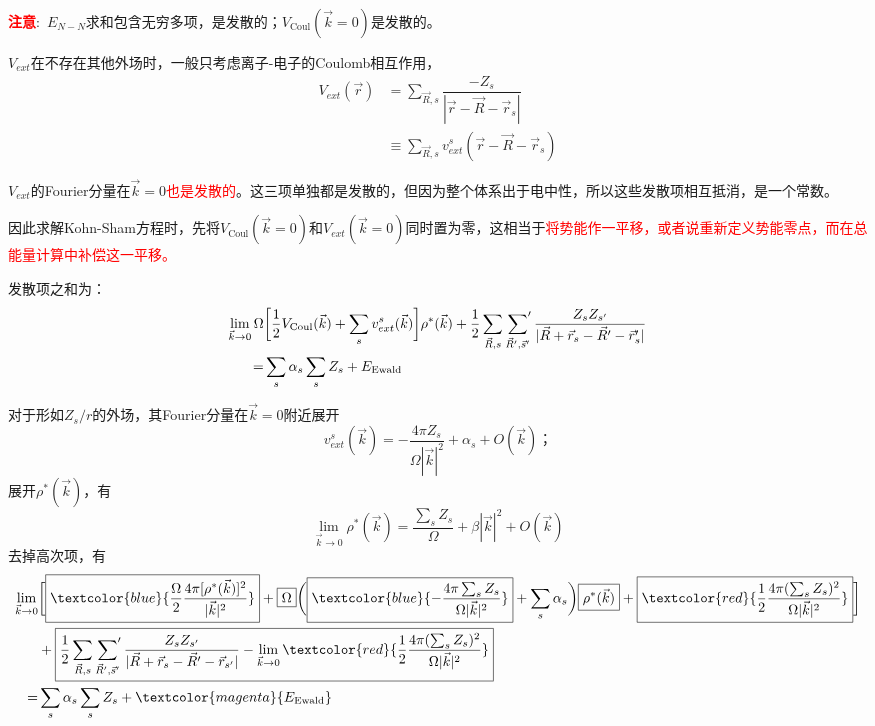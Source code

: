 	\textcolor{red}{\textbf{注意}}:~$E_{N-N}$求和包含无穷多项，是发散的；$V_{\mathrm{Coul}}(\vec k=0)$是发散的。
	
	$V_{ext}$在不存在其他外场时，一般只考虑离子-电子的\textrm{Coulomb}相互作用，
	\begin{equation}
		\begin{aligned}
			V_{ext}(\vec r)&=\sum_{\vec R,s}\dfrac{-Z_s}{|\vec r-\vec R-\vec r_s|}\\
			&\equiv\sum_{\vec R,s}v_{ext}^s(\vec r-\vec R-\vec r_s)
		\end{aligned}
	\end{equation}

	$V_{ext}$的\textrm{Fourier}分量在$\vec k=0$\textcolor{red}{也是发散的}。这三项单独都是发散的，但因为整个体系出于电中性，所以这些发散项相互抵消，是一个常数。

	因此求解\textrm{Kohn-Sham}方程时，先将$V_{\mathrm{Coul}}(\vec k=0)$和$V_{ext}(\vec k=0)$同时置为零，这相当于\textcolor{red}{将势能作一平移，或者说重新定义势能零点，而在总能量计算中补偿这一平移。}

	发散项之和为：
	\begin{equation}
		\begin{aligned}
			\lim_{\vec k\rightarrow0}\Omega&\bigg[\dfrac12V_{\mathrm{Coul}}(\vec k)+\sum_sv_{ext}^s(\vec k)\bigg]\rho^{\ast}(\vec k)+\dfrac12\sum_{\vec R,s}\sideset{}{^{\prime}}\sum_{\vec R^{\prime},\vec s^{\prime}}\dfrac{Z_sZ_{s^{\prime}}}{|\vec R+\vec r_s-\vec R^{\prime}-\vec r_s^{\prime}|}\\
			=&\sum_s\alpha_s\sum_sZ_s+E_{\mathrm{Ewald}}
		\end{aligned}
	\end{equation}

	对于形如$Z_s/r$的外场，其\textrm{Fourier}分量在$\vec k=0$附近展开
	\begin{equation}
		v_{ext}^s(\vec k)=-\dfrac{4\pi Z_s}{\Omega|\vec k|^2}+\alpha_s+O(\vec k)； 
	\end{equation}
	展开$\rho^{\ast}(\vec k)$，有
	\begin{equation}
		\lim_{\vec k\rightarrow 0}\rho^{\ast}(\vec k)=\dfrac{\sum_sZ_s}{\Omega}+\beta|\vec k|^2+O(\vec k)
	\end{equation}
去掉高次项，有
\begin{equation}
	\begin{aligned}
		\lim_{\vec k\rightarrow 0}&\bigg[\boxed{\textcolor{blue}{\dfrac{\Omega}2\dfrac{4\pi[\rho^{\ast}(\vec k)]^2}{|\vec k|^2}}}+\boxed{\Omega}\bigg(\boxed{\textcolor{blue}{-\dfrac{4\pi\sum_sZ_s}{\Omega|\vec k|^2}}}+\sum_s\alpha_s\bigg)\boxed{\rho^{\ast}(\vec k)}+\boxed{\textcolor{red}{\dfrac12\dfrac{4\pi(\sum_sZ_s)^2}{\Omega|\vec k|^2}}}\bigg]\\
		&+\boxed{\dfrac12\sum_{\vec R,s}\sideset{}{^{\prime}}\sum_{\vec R^{\prime},\vec s^{\prime}}\dfrac{Z_sZ_{s^{\prime}}}{|\vec R+\vec r_s-\vec R^{\prime}-\vec r_{s^{\prime}}|}-\lim_{\vec k\rightarrow0}\textcolor{red}{\dfrac12\dfrac{4\pi(\sum_sZ_s)^2}{\Omega|\vec k|^2}}}\\
		=&\sum_s\alpha_s\sum_sZ_s+\textcolor{magenta}{E_{\mathrm{Ewald}}}
	\end{aligned}
\end{equation}


